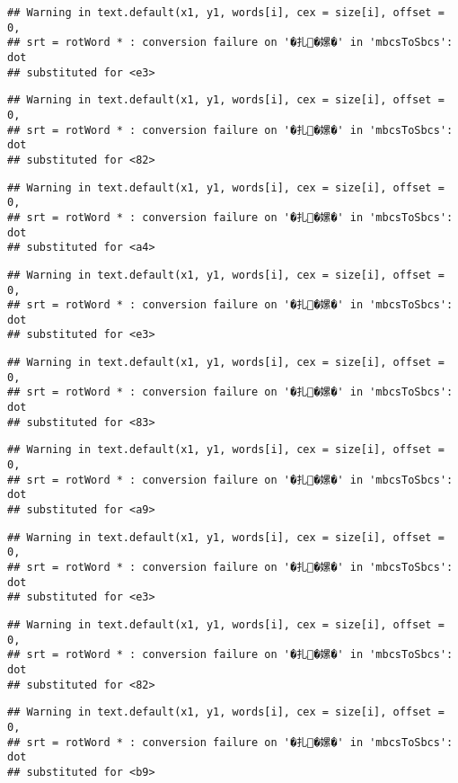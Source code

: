 \documentclass[]{article}
\begin{document}
\begin{verbatim}
## Warning in text.default(x1, y1, words[i], cex = size[i], offset = 0,
## srt = rotWord * : conversion failure on '�扎�嫘�' in 'mbcsToSbcs': dot
## substituted for <e3>
\end{verbatim}

\begin{verbatim}
## Warning in text.default(x1, y1, words[i], cex = size[i], offset = 0,
## srt = rotWord * : conversion failure on '�扎�嫘�' in 'mbcsToSbcs': dot
## substituted for <82>
\end{verbatim}

\begin{verbatim}
## Warning in text.default(x1, y1, words[i], cex = size[i], offset = 0,
## srt = rotWord * : conversion failure on '�扎�嫘�' in 'mbcsToSbcs': dot
## substituted for <a4>
\end{verbatim}

\begin{verbatim}
## Warning in text.default(x1, y1, words[i], cex = size[i], offset = 0,
## srt = rotWord * : conversion failure on '�扎�嫘�' in 'mbcsToSbcs': dot
## substituted for <e3>
\end{verbatim}

\begin{verbatim}
## Warning in text.default(x1, y1, words[i], cex = size[i], offset = 0,
## srt = rotWord * : conversion failure on '�扎�嫘�' in 'mbcsToSbcs': dot
## substituted for <83>
\end{verbatim}

\begin{verbatim}
## Warning in text.default(x1, y1, words[i], cex = size[i], offset = 0,
## srt = rotWord * : conversion failure on '�扎�嫘�' in 'mbcsToSbcs': dot
## substituted for <a9>
\end{verbatim}

\begin{verbatim}
## Warning in text.default(x1, y1, words[i], cex = size[i], offset = 0,
## srt = rotWord * : conversion failure on '�扎�嫘�' in 'mbcsToSbcs': dot
## substituted for <e3>
\end{verbatim}

\begin{verbatim}
## Warning in text.default(x1, y1, words[i], cex = size[i], offset = 0,
## srt = rotWord * : conversion failure on '�扎�嫘�' in 'mbcsToSbcs': dot
## substituted for <82>
\end{verbatim}

\begin{verbatim}
## Warning in text.default(x1, y1, words[i], cex = size[i], offset = 0,
## srt = rotWord * : conversion failure on '�扎�嫘�' in 'mbcsToSbcs': dot
## substituted for <b9>
\end{verbatim}
\end{document}
